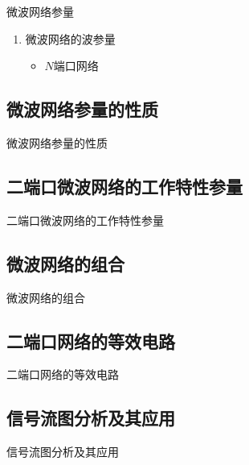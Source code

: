 \begin{frame}{微波网络参量}
    \begin{enumerate}
        \resume
        \item 微波网络的波参量 \\
        \begin{itemize}
            \item $N$端口网络
        \end{itemize}
        
    \end{enumerate}
\end{frame}

\subsection{微波网络参量的性质}
\begin{frame}{微波网络参量的性质}

\end{frame}

\subsection{二端口微波网络的工作特性参量}
\begin{frame}{二端口微波网络的工作特性参量}

\end{frame}

\subsection{微波网络的组合}
\begin{frame}{微波网络的组合}

\end{frame}

\subsection{二端口网络的等效电路}
\begin{frame}{二端口网络的等效电路}

\end{frame}

\subsection{信号流图分析及其应用}
\begin{frame}{信号流图分析及其应用}

\end{frame}

